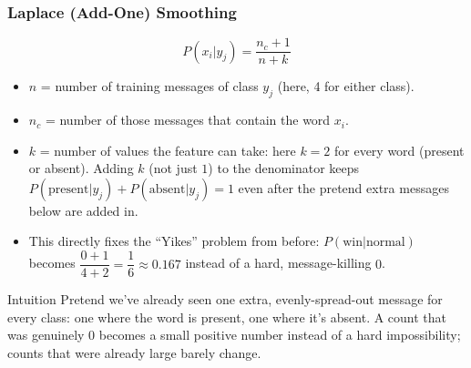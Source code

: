 \begin{frame}[fragile]\frametitle{Laplace (Add-One) Smoothing}
\[
P(x_i|y_j) = \frac{n_c + 1}{n + k}
\]
\begin{itemize}
\item $n$ = number of training messages of class $y_j$ (here, 4 for either class).
\item $n_c$ = number of those messages that contain the word $x_i$.
\item $k$ = number of values the feature can take: here $k=2$ for every word (present or absent). Adding $k$ (not just $1$) to the denominator keeps $P(\text{present}|y_j)+P(\text{absent}|y_j)=1$ even after the pretend extra messages below are added in.
\item This directly fixes the ``Yikes'' problem from before: $P(\text{win}|\text{normal})$ becomes $\dfrac{0+1}{4+2}=\dfrac{1}{6}\approx0.167$ instead of a hard, message-killing $0$.
\end{itemize}
\begin{block}{Intuition}
Pretend we've already seen one extra, evenly-spread-out message for every class: one where the
word is present, one where it's absent. A count that was genuinely 0 becomes a small positive
number instead of a hard impossibility; counts that were already large barely change.
\end{block}
\end{frame}

